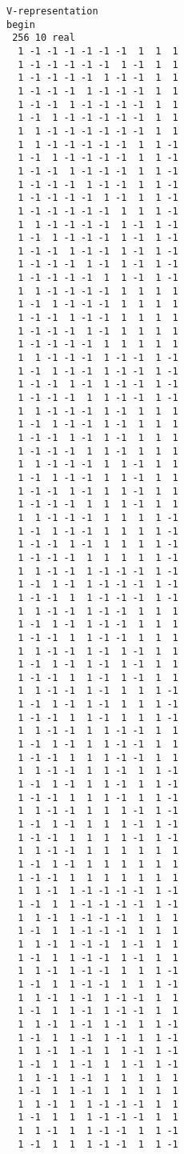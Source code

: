 \documentclass[%
  twocolumn,
 showpacs,
 showkeys,
 preprintnumbers,
 amsmath,amssymb,
 aps,
  pra,
  longbibliography,
 floatfix,
 ]{revtex4-1}
\begin{document}
{\begin{lstlisting}[backgroundcolor=\color{yellow!10},framerule=0pt,breaklines=true, frame=tb]
V-representation
begin
 256 10 real
  1 -1 -1 -1 -1 -1 -1  1  1  1
  1 -1 -1 -1 -1 -1  1 -1  1  1
  1 -1 -1 -1 -1  1 -1 -1  1  1
  1 -1 -1 -1  1 -1 -1 -1  1  1
  1 -1 -1  1 -1 -1 -1 -1  1  1
  1 -1  1 -1 -1 -1 -1 -1  1  1
  1  1 -1 -1 -1 -1 -1 -1  1  1
  1  1 -1 -1 -1 -1 -1  1  1 -1
  1 -1  1 -1 -1 -1 -1  1  1 -1
  1 -1 -1  1 -1 -1 -1  1  1 -1
  1 -1 -1 -1  1 -1 -1  1  1 -1
  1 -1 -1 -1 -1  1 -1  1  1 -1
  1 -1 -1 -1 -1 -1  1  1  1 -1
  1  1 -1 -1 -1 -1  1 -1  1 -1
  1 -1  1 -1 -1 -1  1 -1  1 -1
  1 -1 -1  1 -1 -1  1 -1  1 -1
  1 -1 -1 -1  1 -1  1 -1  1 -1
  1 -1 -1 -1 -1  1  1 -1  1 -1
  1  1 -1 -1 -1 -1  1  1  1  1
  1 -1  1 -1 -1 -1  1  1  1  1
  1 -1 -1  1 -1 -1  1  1  1  1
  1 -1 -1 -1  1 -1  1  1  1  1
  1 -1 -1 -1 -1  1  1  1  1  1
  1  1 -1 -1 -1  1 -1 -1  1 -1
  1 -1  1 -1 -1  1 -1 -1  1 -1
  1 -1 -1  1 -1  1 -1 -1  1 -1
  1 -1 -1 -1  1  1 -1 -1  1 -1
  1  1 -1 -1 -1  1 -1  1  1  1
  1 -1  1 -1 -1  1 -1  1  1  1
  1 -1 -1  1 -1  1 -1  1  1  1
  1 -1 -1 -1  1  1 -1  1  1  1
  1  1 -1 -1 -1  1  1 -1  1  1
  1 -1  1 -1 -1  1  1 -1  1  1
  1 -1 -1  1 -1  1  1 -1  1  1
  1 -1 -1 -1  1  1  1 -1  1  1
  1  1 -1 -1 -1  1  1  1  1 -1
  1 -1  1 -1 -1  1  1  1  1 -1
  1 -1 -1  1 -1  1  1  1  1 -1
  1 -1 -1 -1  1  1  1  1  1 -1
  1  1 -1 -1  1 -1 -1 -1  1 -1
  1 -1  1 -1  1 -1 -1 -1  1 -1
  1 -1 -1  1  1 -1 -1 -1  1 -1
  1  1 -1 -1  1 -1 -1  1  1  1
  1 -1  1 -1  1 -1 -1  1  1  1
  1 -1 -1  1  1 -1 -1  1  1  1
  1  1 -1 -1  1 -1  1 -1  1  1
  1 -1  1 -1  1 -1  1 -1  1  1
  1 -1 -1  1  1 -1  1 -1  1  1
  1  1 -1 -1  1 -1  1  1  1 -1
  1 -1  1 -1  1 -1  1  1  1 -1
  1 -1 -1  1  1 -1  1  1  1 -1
  1  1 -1 -1  1  1 -1 -1  1  1
  1 -1  1 -1  1  1 -1 -1  1  1
  1 -1 -1  1  1  1 -1 -1  1  1
  1  1 -1 -1  1  1 -1  1  1 -1
  1 -1  1 -1  1  1 -1  1  1 -1
  1 -1 -1  1  1  1 -1  1  1 -1
  1  1 -1 -1  1  1  1 -1  1 -1
  1 -1  1 -1  1  1  1 -1  1 -1
  1 -1 -1  1  1  1  1 -1  1 -1
  1  1 -1 -1  1  1  1  1  1  1
  1 -1  1 -1  1  1  1  1  1  1
  1 -1 -1  1  1  1  1  1  1  1
  1  1 -1  1 -1 -1 -1 -1  1 -1
  1 -1  1  1 -1 -1 -1 -1  1 -1
  1  1 -1  1 -1 -1 -1  1  1  1
  1 -1  1  1 -1 -1 -1  1  1  1
  1  1 -1  1 -1 -1  1 -1  1  1
  1 -1  1  1 -1 -1  1 -1  1  1
  1  1 -1  1 -1 -1  1  1  1 -1
  1 -1  1  1 -1 -1  1  1  1 -1
  1  1 -1  1 -1  1 -1 -1  1  1
  1 -1  1  1 -1  1 -1 -1  1  1
  1  1 -1  1 -1  1 -1  1  1 -1
  1 -1  1  1 -1  1 -1  1  1 -1
  1  1 -1  1 -1  1  1 -1  1 -1
  1 -1  1  1 -1  1  1 -1  1 -1
  1  1 -1  1 -1  1  1  1  1  1
  1 -1  1  1 -1  1  1  1  1  1
  1  1 -1  1  1 -1 -1 -1  1  1
  1 -1  1  1  1 -1 -1 -1  1  1
  1  1 -1  1  1 -1 -1  1  1 -1
  1 -1  1  1  1 -1 -1  1  1 -1

\end{lstlisting}}
\end{document}
